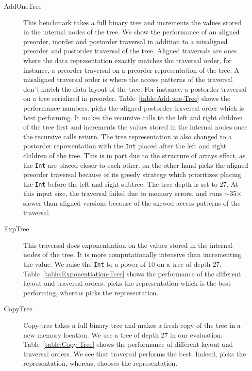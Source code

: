 \begin{description}

\item[AddOneTree]
This benchmark takes a full binary tree and increments the values stored in the internal nodes of the tree.
We show the performance of an aligned preorder, inorder and postorder traversal in addition to a misaligned 
preorder and postorder traversal of the tree. Aligned traversals are ones where the data representation exactly
matches the traversal order, for instance, a preorder traversal on a preorder representation of the tree. 
A misaligned traversal order is where the access patterns of the traversal don't match the data layout of the tree.
For instance, a postorder traversal on a tree serialized in preorder. 
Table~\ref{table:Add-one-Tree} shows the performance numbers.
\systemSolver picks the aligned postorder traversal order which is best performing. It makes the recursive calls to the left and right children of the
tree first and increments the values stored in the internal nodes once the recursive calls return. The tree representation is also changed to a postorder
representation with the \lstinline|Int| placed after the left and right children of the tree. 
This is in part due to the structure of arrays effect, as the \lstinline|Int| are placed closer to each other.
\systemGreedy on the other hand picks the 
aligned preorder traversal because of its greedy strategy which prioritizes placing the \lstinline|Int| before the left and right subtree.
The tree depth is set to 27. At this input size, the \misalignedPost traversal failed due to memory errors, and
\misalignedPre runs $\sim$35$\times$ slower than aligned versions because of the skewed access patterns of the traversal.

\item[ExpTree]
This traversal does exponentiation on the values stored in the internal nodes of the tree. It is more computationally intensive than incrementing the value.
We raise the \lstinline|Int| to a power of 10 on a tree of depth 27. Table~\ref{table:Exponentiation-Tree} shows the performance of the different layout and traversal orders.
\systemSolver picks the \alignedPost representation which is the best performing, whereas \systemGreedy picks the \alignedPre representation. 

\item[CopyTree]
Copy-tree takes a full binary tree and makes a fresh copy of the tree in a new memory location.
We use a tree of depth 27 in our evaluation. Table~\ref{table:Copy-Tree} shows the performance of different layout and traversal orders. 
We see that \alignedPost traversal performs the best. Indeed, \systemSolver picks the \alignedPost representation, whereas, \systemGreedy chooses the 
\alignedPre representation.


\end{description}
